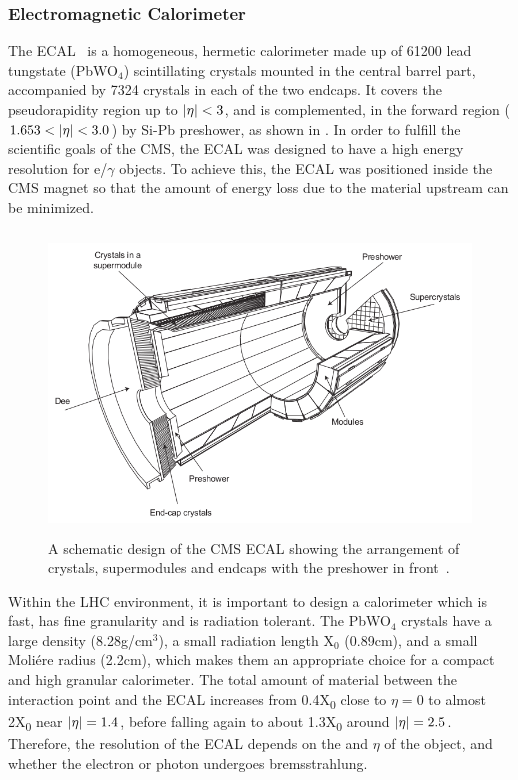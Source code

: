 \subsubsection{Electromagnetic Calorimeter}
The ECAL~\cite{Chatrchyan:2008aa,ecalTDR} is a homogeneous, hermetic calorimeter made up of 61200 lead tungstate (PbWO$_4$) scintillating crystals 
mounted in the central barrel part, accompanied by 7324 crystals in each of the two endcaps. It covers the pseudorapidity region up to
$\lvert \eta \rvert<3$, and is complemented, in the forward region ($1.653<\lvert \eta \rvert<3.0$) by Si-Pb preshower, as shown in \fig{\ref{fig:Ecal}}. In order 
to fulfill the scientific goals of the CMS, the ECAL was designed to have a high energy resolution for e/$\gamma$ objects. To achieve this, the ECAL 
was positioned inside the CMS magnet so that the amount of energy loss due to the material upstream can be minimized. 
\begin{figure}[h!]
 \centering
 \includegraphics[width=13cm,height=8cm]{ch2/figures/cmsECAL.png}
 \caption{A schematic design of the CMS ECAL showing the arrangement of crystals, supermodules and endcaps with the preshower in front~\cite{Chatrchyan:2008aa}.}
 \label{fig:Ecal}
\end{figure}
Within the LHC environment, it is important to design a calorimeter which is fast, has fine granularity and is radiation tolerant. 
The PbWO$_4$ crystals have a large density (8.28\unit{g}/cm$^{3}$), a small radiation length X$_{0}$ (0.89\unit{cm}), and a small Moli\'{e}re 
radius (2.2\unit{cm}), which makes them an appropriate choice for a compact and high granular calorimeter. The total amount of material between the 
interaction point and the ECAL increases from 0.4\unit{X_0} close to $\eta=0$ to almost 2\unit{X_0} near $\lvert \eta \rvert=1.4$, before falling 
again to about 1.3\unit{X_0} around $\lvert \eta \rvert=2.5$. Therefore, the resolution of the ECAL depends on the \pt and $\eta$ of the object,
and whether the electron or photon undergoes bremsstrahlung.

